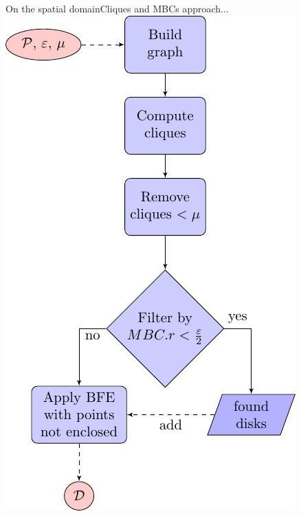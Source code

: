 \documentclass{beamer}
\begin{document}
\begin{frame}{On the spatial domain}{Cliques and MBCs approach...}
    \centering
    \includegraphics[width=0.5\textheight]{figures/CMBC_flowchart2.pdf}
\end{frame}
\end{document}
